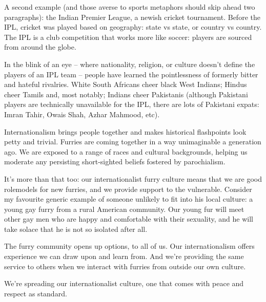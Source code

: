 A second example (and those averse to sports metaphors should skip ahead two paragraphs): the Indian Premier League, a newish cricket tournament. Before the IPL, cricket was played based on geography: state vs state, or country vs country. The IPL is a club competition that works more like soccer: players are sourced from around the globe.

In the blink of an eye -- where nationality, religion, or culture doesn't define the players of an IPL team -- people have learned the pointlessness of formerly bitter and hateful rivalries. White South Africans cheer black West Indians; Hindus cheer Tamils and, most notably; Indians cheer Pakistanis (although Pakistani players are technically unavailable for the IPL, there are lots of Pakistani expats: Imran Tahir, Owais Shah, Azhar Mahmood, etc).

Internationalism brings people together and makes historical flashpoints look petty and trivial. Furries are coming together in a way unimaginable a generation ago. We are exposed to a range of races and cultural backgrounds, helping us moderate any persisting short-sighted beliefs fostered by parochialism.

It's more than that too: our internationalist furry culture means that we are good rolemodels for new furries, and we provide support to the vulnerable. Consider my favourite generic example of someone unlikely to fit into his local culture: a young gay furry from a rural American community. Our young fur will meet other gay men who are happy and comfortable with their sexuality, and he will take solace that he is not so isolated after all.

The furry community opens up options, to all of us. Our internationalism offers experience we can draw upon and learn from. And we're providing the same service to others when we interact with furries from outside our own culture.

We're spreading our internationalist culture, one that comes with peace and respect as standard.
